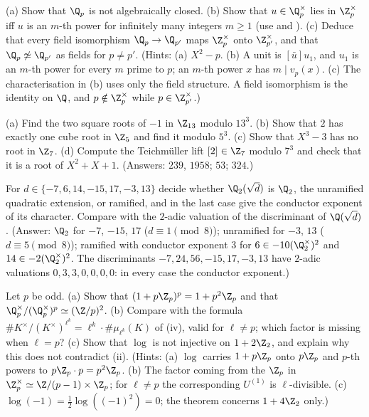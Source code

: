 \begin{exercise}\label{ex:local:ex-not-iso}
(a) Show that $\Q_p$ is not algebraically closed. (b) Show that $u\in\Q_p^\times$ lies in $\Z_p^\times$ iff $u$ is an $m$-th power for infinitely many integers $m\ge1$
(use  and ). (c) Deduce that every field isomorphism $\Q_p\to\Q_{p'}$ maps $\Z_p^\times$ onto $\Z_{p'}^\times$, and
that $\Q_p\not\simeq\Q_{p'}$ as fields for $p\ne p'$. (Hints: (a) $X^2-p$. (b) A unit is $[\bar u]u_1$, and $u_1$ is an $m$-th power for every $m$ prime
to $p$; an $m$-th power $x$ has $m\mid v_p(x)$. (c) The characterisation in (b) uses only the field structure. A field isomorphism is the identity on $\Q$, and
$p\notin\Z_p^\times$ while $p\in\Z_{p'}^\times$.)
\end{exercise}

\begin{exercise}\label{ex:local:ex-hensel}
(a) Find the two square roots of $-1$ in $\Z_{13}$ modulo $13^3$. (b) Show that $2$ has exactly one cube root in $\Z_5$ and find it modulo $5^3$. (c) Show that
$X^3-3$ has no root in $\Z_7$. (d) Compute the Teichm\"uller lift $[2]\in\Z_7$ modulo $7^3$ and check that it is a root of $X^2+X+1$. (Answers: $239$, $1958$; $53$;
$324$.)
\end{exercise}

\begin{exercise}\label{ex:local:ex-q2}
For $d\in\{-7,6,14,-15,17,-3,13\}$ decide whether $\Q_2(\sqrt d)$ is $\Q_2$, the unramified quadratic extension, or ramified, and in the last case give the
conductor exponent of its character. Compare with the $2$-adic valuation of the discriminant of $\Q(\sqrt d)$. (Answer: $\Q_2$ for $-7$, $-15$, $17$
($d\equiv1\pmod8$); unramified for $-3$, $13$ ($d\equiv5\pmod8$); ramified with conductor exponent $3$ for $6\in-10(\Q_2^\times)^2$ and
$14\in-2(\Q_2^\times)^2$. The discriminants $-7,24,56,-15,17,-3,13$ have $2$-adic valuations $0,3,3,0,0,0,0$: in every case the conductor exponent.)
\end{exercise}

\begin{exercise}\label{ex:local:ex-pth-powers}
Let $p$ be odd. (a) Show that $(1+p\Z_p)^p=1+p^2\Z_p$ and that $\Q_p^\times/(\Q_p^\times)^p\simeq(\Z/p)^2$. (b) Compare with the formula
$\#K^\times/(K^\times)^{\ell^k}=\ell^k\cdot\#\mu_{\ell^k}(K)$ of (iv), valid for $\ell\ne p$; which factor is missing when $\ell=p$? (c) Show that $\log$ is not
injective on $1+2\Z_2$, and explain why this does not contradict (ii). (Hints: (a) $\log$ carries $1+p\Z_p$ onto $p\Z_p$ and
$p$-th powers to $p\Z_p\cdot p=p^2\Z_p$. (b) The factor coming from the $\Z_p$ in $\Z_p^\times\simeq\Z/(p-1)\times\Z_p$; for $\ell\ne p$ the corresponding $U^{(1)}$ is
$\ell$-divisible. (c) $\log(-1)=\frac12\log((-1)^2)=0$; the theorem concerns $1+4\Z_2$ only.)
\end{exercise}


